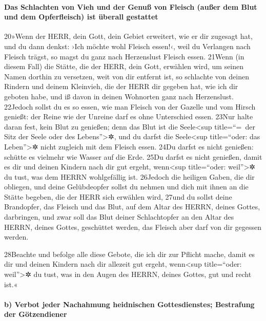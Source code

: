\hypertarget{das-schlachten-von-vieh-und-der-genuuxdf-von-fleisch-auuxdfer-dem-blut-und-dem-opferfleisch-ist-uxfcberall-gestattet}{%
\paragraph{Das Schlachten von Vieh und der Genuß von Fleisch (außer dem
Blut und dem Opferfleisch) ist überall
gestattet}\label{das-schlachten-von-vieh-und-der-genuuxdf-von-fleisch-auuxdfer-dem-blut-und-dem-opferfleisch-ist-uxfcberall-gestattet}}

20»Wenn der HERR, dein Gott, dein Gebiet erweitert, wie er dir zugesagt
hat, und du dann denkst: ›Ich möchte wohl Fleisch essen!‹, weil du
Verlangen nach Fleisch trägst, so magst du ganz nach Herzenslust Fleisch
essen. 21Wenn (in diesem Fall) die Stätte, die der HERR, dein Gott,
erwählen wird, um seinen Namen dorthin zu versetzen, weit von dir
entfernt ist, so schlachte von deinen Rindern und deinem Kleinvieh, die
der HERR dir gegeben hat, wie ich dir geboten habe, und iß davon in
deinen Wohnorten ganz nach Herzenslust. 22Jedoch sollst du es so essen,
wie man Fleisch von der Gazelle und vom Hirsch genießt: der Reine wie
der Unreine darf es ohne Unterschied essen. 23Nur halte daran fest, kein
Blut zu genießen; denn das Blut ist die Seele\textless sup title=``=~der
Sitz der Seele oder des Lebens''\textgreater✲, und du darfst die
Seele\textless sup title=``oder: das Leben''\textgreater✲ nicht zugleich
mit dem Fleisch essen. 24Du darfst es nicht genießen: schütte es
vielmehr wie Wasser auf die Erde. 25Du darfst es nicht genießen, damit
es dir und deinen Kindern nach dir gut ergeht, wenn\textless sup
title=``oder: weil''\textgreater✲ du tust, was dem HERRN wohlgefällig
ist. 26Jedoch die heiligen Gaben, die dir obliegen, und deine
Gelübdeopfer sollst du nehmen und dich mit ihnen an die Stätte begeben,
die der HERR sich erwählen wird, 27und du sollst deine Brandopfer, das
Fleisch und das Blut, auf dem Altar des HERRN, deines Gottes,
darbringen, und zwar soll das Blut deiner Schlachtopfer an den Altar des
HERRN, deines Gottes, geschüttet werden, das Fleisch aber darf von dir
gegessen werden.

28Beachte und befolge alle diese Gebote, die ich dir zur Pflicht mache,
damit es dir und deinen Kindern nach dir allezeit gut ergeht,
wenn\textless sup title=``oder: weil''\textgreater✲ du tust, was in den
Augen des HERRN, deines Gottes, gut und recht ist.«

\hypertarget{b-verbot-jeder-nachahmung-heidnischen-gottesdienstes-bestrafung-der-guxf6tzendiener}{%
\paragraph{b) Verbot jeder Nachahmung heidnischen Gottesdienstes;
Bestrafung der
Götzendiener}\label{b-verbot-jeder-nachahmung-heidnischen-gottesdienstes-bestrafung-der-guxf6tzendiener}}

